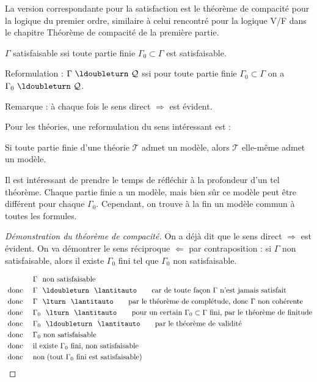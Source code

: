 \documentclass[11pt,class=report,crop=false]{standalone}
\begin{document}
La version correspondante pour la satisfaction est le théorème de compacité pour la logique du premier ordre, similaire à celui rencontré pour la logique V/F dans le chapitre \og{}Théorème de compacité\fg{} de la première partie.


\begin{theoreme}
	$\Gamma$ satisfaisable ssi toute partie finie $\Gamma_0 \subset \Gamma$ est satisfaisable.
\end{theoreme}

Reformulation : $\Gamma \ \ldoubleturn \ \mathcal{Q}$ ssi pour toute partie finie $\Gamma_0 \subset \Gamma$ on a $\Gamma_0 \ \ldoubleturn \ \mathcal{Q}$. 

Remarque : à chaque fois le sens direct $\Rightarrow$ est évident.

Pour les théories, une reformulation du sens intéressant est :
\begin{theoreme}
	Si toute partie finie d'une théorie $\mathcal{T}$ admet un modèle, alors $\mathcal{T}$ elle-même admet un modèle.
\end{theoreme}

Il est intéressant de prendre le temps de réfléchir à la profondeur d'un tel théorème.
Chaque partie finie a un modèle, mais bien sûr ce modèle peut être différent pour chaque $\Gamma_0$.
Cependant, on trouve à la fin un modèle commun à toutes les formules.

\begin{proof}[Démonstration du théorème de compacité]
On a déjà dit que le sens direct $\Rightarrow$ est évident.
On va démontrer le sens réciproque $\Leftarrow$ par contraposition : \og{}si $\Gamma$ non satisfaisable, alors il existe $\Gamma_0$ fini tel que $\Gamma_0$ non satisfaisable.\fg{}	
	
\begin{align*}
	&  \Gamma \ \text{ non satisfaisable}\\
	\text{ donc } \quad 	& \Gamma \ \ \ldoubleturn \ \ \lantitauto \qquad \text{car de toute façon $\Gamma$ n'est jamais satisfait}\\
	\text{ donc } \quad 	& \Gamma \ \ \lturn \ \ \lantitauto \qquad \text{par le théorème de complétude, donc $\Gamma$ non cohérente}\\
	\text{ donc } \quad 	& \Gamma_0 \ \ \lturn \ \ \lantitauto \qquad \text{pour un certain $\Gamma_0 \subset \Gamma$ fini, par le théorème de finitude}\\
	\text{ donc } \quad 	& \Gamma_0 \ \ \ldoubleturn \ \ \lantitauto \qquad \text{par le théorème de validité}\\			
	\text{ donc } \quad 	& \Gamma_0 \ \text{non satisfaisable}\\
	\text{ donc } \quad 	& \text{il existe $\Gamma_0$ fini, non satisfaisable}\\			
	\text{ donc } \quad 	& \text{non\;(tout $\Gamma_0$ fini est satisfaisable)}		
\end{align*} 	
	
\end{proof}
\end{document}
